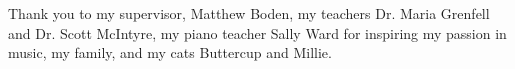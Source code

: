 \cleardoublepage{}
\begin{center}
	
	Thank you to my supervisor, Matthew Boden, my teachers Dr. Maria Grenfell and Dr. Scott McIntyre, my piano teacher Sally Ward for inspiring my passion in music, my family, and my cats Buttercup and Millie.
	
\end{center}
\cleardoublepage{}
